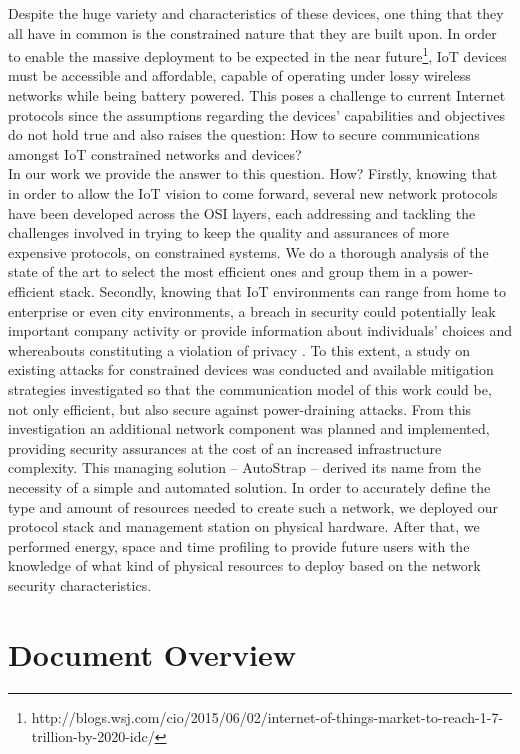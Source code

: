 Despite the huge variety and characteristics of these devices, one thing that they all have in common is the constrained nature that they are built upon. In order to enable the massive deployment to be expected in the near future\footnote{http://blogs.wsj.com/cio/2015/06/02/internet-of-things-market-to-reach-1-7-trillion-by-2020-idc/}, \gls{IoT} devices must be accessible and affordable, capable of operating under lossy wireless networks while being battery powered. This poses a challenge to current Internet protocols since the assumptions regarding the devices' capabilities and objectives do not hold true \cite{Trappe2015} and also raises the question: How to secure communications amongst \gls{IoT} constrained networks and devices? \\In our work we provide the answer to this question. How? Firstly, knowing that in order to allow the \gls{IoT} vision to come forward, several new network protocols have been developed across the OSI layers, each addressing and tackling the challenges involved in trying to keep the quality and assurances of more expensive protocols, on constrained systems. We do a thorough analysis of the state of the art to select the most efficient ones and group them in a power-efficient stack. Secondly, knowing that \gls{IoT} environments can range from home to enterprise or even city environments, a breach in security could potentially leak important company activity or provide information about individuals' choices and whereabouts constituting a violation of privacy \cite{Ukil2015}. To this extent, a study on existing attacks for constrained devices was conducted and available mitigation strategies investigated so that the communication model of this work could be, not only efficient, but also secure against power-draining attacks. From this investigation an additional network component was planned and implemented, providing security assurances at the cost of an increased infrastructure complexity. This managing solution -- AutoStrap -- derived its name from the necessity of a simple and automated solution. In order to accurately define the type and amount of resources needed to create such a network, we deployed our protocol stack and management station on physical hardware. After that, we performed energy, space and time profiling to provide future users with the knowledge of what kind of physical resources to deploy based on the network security characteristics.

\section{Document Overview}

